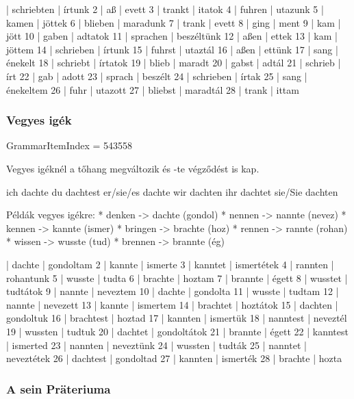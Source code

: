 \documentclass{article}
\newenvironment{desc}{\verbatim}{\endverbatim}
\newenvironment{exmp}{\verbatim}{\endverbatim}
\begin{document}
\begin{exmp}
1 | schriebten | írtunk
2 | aß | evett
3 | trankt | itatok
4 | fuhren | utazunk
5 | kamen | jöttek
6 | blieben | maradunk
7 | trank | evett
8 | ging | ment
9 | kam | jött
10 | gaben | adtatok
11 | sprachen | beszéltünk
12 | aßen | ettek
13 | kam | jöttem
14 | schrieben | írtunk
15 | fuhrst | utaztál
16 | aßen | ettünk
17 | sang | énekelt
18 | schriebt | írtatok
19 | blieb | maradt
20 | gabst | adtál
21 | schrieb | írt
22 | gab | adott
23 | sprach | beszélt
24 | schrieben | írtak
25 | sang | énekeltem
26 | fuhr | utazott
27 | bliebst | maradtál
28 | trank | ittam
\end{exmp}

\subsubsection{Vegyes igék}

GrammarItemIndex = 543558

\begin{desc}
Vegyes igéknél a tőhang megváltozik és -te végződést is kap.

ich dachte
du dachtest
er/sie/es dachte
wir dachten
ihr dachtet
sie/Sie dachten

Példák vegyes igékre:
* denken -> dachte (gondol)
* nennen -> nannte (nevez)
* kennen -> kannte (ismer)
* bringen -> brachte (hoz)
* rennen -> rannte (rohan)
* wissen -> wusste (tud)
* brennen -> brannte (ég)
\end{desc}

\begin{exmp}
1 | dachte | gondoltam
2 | kannte | ismerte
3 | kanntet | ismertétek
4 | rannten | rohantunk
5 | wusste | tudta
6 | brachte | hoztam
7 | brannte | égett
8 | wusstet | tudtátok
9 | nannte | neveztem
10 | dachte | gondolta
11 | wusste | tudtam
12 | nannte | nevezett
13 | kannte | ismertem
14 | brachtet | hoztátok
15 | dachten | gondoltuk
16 | brachtest | hoztad
17 | kannten | ismertük
18 | nanntest | neveztél
19 | wussten | tudtuk
20 | dachtet | gondoltátok
21 | brannte | égett
22 | kanntest | ismerted
23 | nannten | neveztünk
24 | wussten | tudták
25 | nanntet | neveztétek
26 | dachtest | gondoltad
27 | kannten | ismerték
28 | brachte | hozta
\end{exmp}

\subsubsection{A sein Präteriuma}
\end{document}
